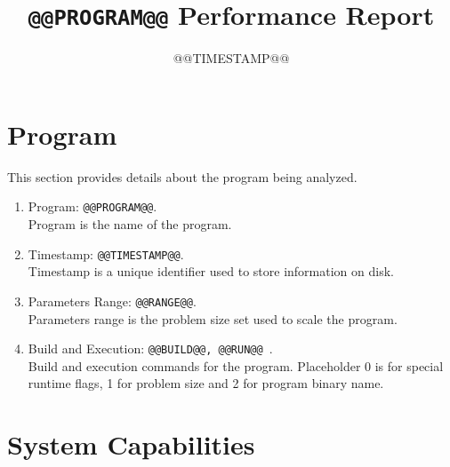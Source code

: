 \documentclass[a4paper]{article}
\begin{document}
\title{{\tt @@PROGRAM@@} Performance Report}

\date{@@TIMESTAMP@@}
\author{}

\maketitle


\begin{multicols}{2}
  \tableofcontents
\end{multicols}

\section{Program}

This section provides details about the program being analyzed.

\begin{enumerate}
\item Program: {\tt @@PROGRAM@@}. \\Program is the name of the program.
\item Timestamp: {\tt @@TIMESTAMP@@}. \\Timestamp is a unique identifier used to store information on disk.
\item Parameters Range: {\tt @@RANGE@@}. \\Parameters range is the problem size set used to scale the program. 
\item Build and Execution: {\tt @@BUILD@@, @@RUN@@ }. \\Build and execution commands for the program. Placeholder 0 is for special runtime flags, 1 for problem size and 2 for program binary name.
\end{enumerate}

\section{System Capabilities}
\end{document}
